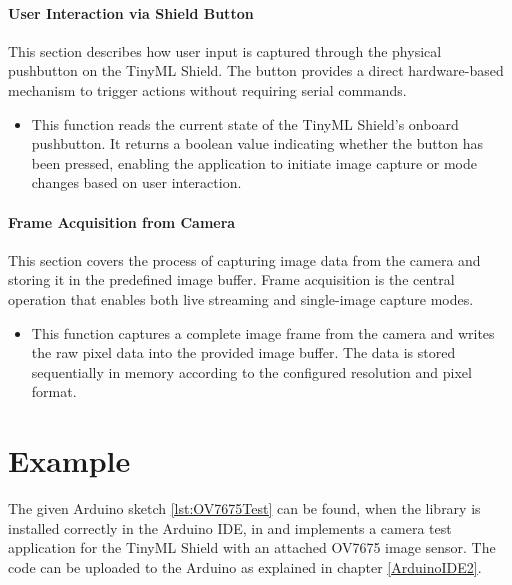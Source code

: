 \paragraph{User Interaction via Shield Button}
This section describes how user input is captured through the physical pushbutton on the TinyML Shield. The button provides a direct hardware-based mechanism to trigger actions without requiring serial commands.

\begin{itemize}
	\item {} 
	
	This function reads the current state of the TinyML Shield’s onboard pushbutton. It returns a boolean value indicating whether the button has been pressed, enabling the application to initiate image capture or mode changes based on user interaction.
\end{itemize}


\paragraph{Frame Acquisition from Camera}

This section covers the process of capturing image data from the camera and storing it in the predefined image buffer. Frame acquisition is the central operation that enables both live streaming and single-image capture modes.

\begin{itemize}
	\item {} 
	
	This function captures a complete image frame from the camera and writes the raw pixel data into the provided image buffer. The data is stored sequentially in memory according to the configured resolution and pixel format.
\end{itemize}


\section{Example}

The given Arduino sketch \ref{lst:OV7675Test} can be found, when the library is installed correctly in the Arduino IDE, in  and implements a camera test application for the TinyML Shield with an attached OV7675 image sensor. The code can be uploaded to the Arduino as explained in chapter \ref{ArduinoIDE2}.

